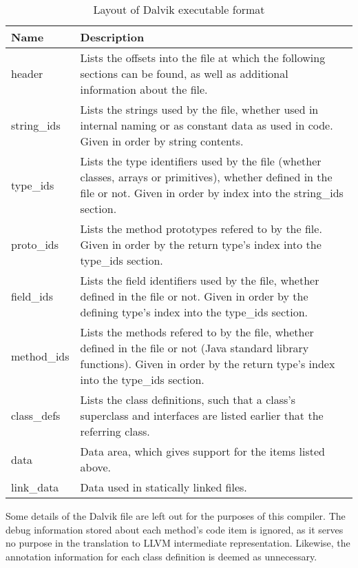 \begin{center}
\begin{table}[htbp]
    \begin{tabular}{ | l | p{10cm} | } \hline
    Name 		& Description \\ \hline
    header		&	Lists the offsets into the file at which the following sections can be found, as well as additional information about the file. \\ \hline
	string\_ids	&	Lists the strings used by the file, whether used in internal naming or as constant data as used in code. Given in order by string contents. \\ \hline
	type\_ids	&	Lists the type identifiers used by the file (whether classes, arrays or primitives), whether defined in the file or not. Given in order by index into the string\_ids section. \\ \hline
	proto\_ids	&	Lists the method prototypes refered to by the file. Given in order by the return type's index into the type\_ids section. \\ \hline
	field\_ids	&	Lists the field identifiers used by the file, whether defined in the file or not. Given in order by the defining type's index into the type\_ids section. \\ \hline
	method\_ids	&	Lists the methods refered to by the file, whether defined in the file or not (\ie Java standard library functions).
					Given in order by the return type's index into the type\_ids section. \\ \hline
	class\_defs	&	Lists the class definitions, such that a class's superclass and interfaces are listed earlier that the referring class. \\ \hline
	data		&	Data area, which gives support for the items listed above. \\ \hline
	link\_data	&	Data used in statically linked files. \\ \hline
    \end{tabular}
    
    \caption{Layout of Dalvik executable format}
    \label{dalvik_layout}
    
\end{table}
\end{center}

\newpage

Some details of the Dalvik file are left out for the purposes of this compiler. The debug information stored about each method's code item is ignored, as it serves no purpose in the translation to LLVM intermediate representation. Likewise, the annotation information for each class definition is deemed as unnecessary.
